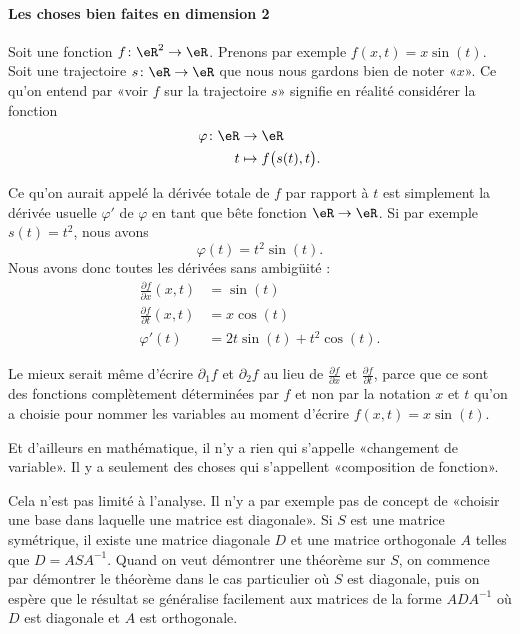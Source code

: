 \paragraph{Les choses bien faites en dimension 2}

Soit une fonction \( f\colon \eR^2\to \eR\). Prenons par exemple \( f(x,t)=x\sin(t)\). Soit une trajectoire \( s\colon \eR\to \eR\) que nous nous gardons bien de noter «\( x\)». Ce qu'on entend par «voir \( f\) sur la trajectoire \( s\)»  signifie en réalité considérer la fonction
\begin{equation}
	\begin{aligned}
		\varphi\colon \eR & \to \eR                       \\
		t                 & \mapsto f\big( s(t), t \big).
	\end{aligned}
\end{equation}

Ce qu'on aurait appelé la dérivée totale de \( f\) par rapport à \( t\) est simplement la dérivée usuelle \( \varphi'\) de \( \varphi\) en tant que bête fonction \( \eR\to \eR\). Si par exemple \( s(t)=t^2\), nous avons
\begin{equation}
	\varphi(t)=t^2\sin(t).
\end{equation}
Nous avons donc toutes les dérivées sans ambigüité :
\begin{subequations}
	\begin{align}
		\frac{ \partial f }{ \partial x }(x,t) & =\sin(t)               \\
		\frac{ \partial f }{ \partial t }(x,t) & =x\cos(t)              \\
		\varphi'(t)                            & =2t\sin(t)+t^2\cos(t).
	\end{align}
\end{subequations}

Le mieux serait même d'écrire \( \partial_1f\) et \( \partial_2f\) au lieu de \( \frac{ \partial f }{ \partial x }\) et \( \frac{ \partial f }{ \partial t }\), parce que ce sont des fonctions complètement déterminées par \( f\) et non par la notation \( x\) et \( t\) qu'on a choisie pour nommer les variables au moment d'écrire \( f(x,t)=x\sin(t)\).

\begin{normaltext}
	Et d'ailleurs en mathématique, il n'y a rien qui s'appelle «changement de variable». Il y a seulement des choses qui s'appellent «composition de fonction».

	Cela n'est pas limité à l'analyse. Il n'y a par exemple pas de concept de «choisir une base dans laquelle une matrice est diagonale». Si \(S\) est une matrice symétrique, il existe une matrice diagonale \( D\) et une matrice orthogonale \( A \) telles que \( D=ASA^{-1}\). Quand on veut démontrer une théorème sur \( S\), on commence par démontrer le théorème dans le cas particulier où \( S\) est diagonale, puis on espère que le résultat se généralise facilement aux matrices de la forme \( ADA^{-1}\) où \( D\) est diagonale et \( A\) est orthogonale.
\end{normaltext}

